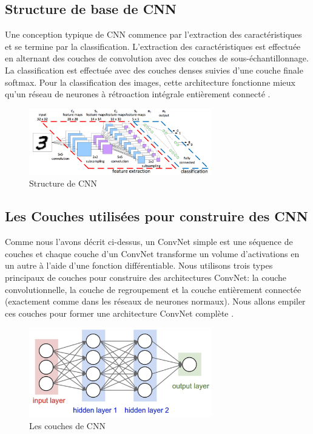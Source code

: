 \documentclass[12pt]{report}
\begin{document}
\subsection{Structure de base de CNN}
Une conception typique de CNN commence par l'extraction des caractéristiques et se termine par la classification. L'extraction des caractéristiques est effectuée en alternant des couches de convolution avec des couches de sous-échantillonnage. La classification est effectuée avec des couches denses suivies d'une couche finale softmax. Pour la classification des images, cette architecture fonctionne mieux qu'un réseau de neurones à rétroaction intégrale entièrement connecté \cite{ref13} .
\begin{figure}[h]
\begin{center}
\includegraphics[width=300]{extract.png}
\caption{Structure de CNN}
\label{Structure de CNN}
\end{center}
\end{figure}


\subsection{Les Couches utilisées pour construire des CNN}
Comme nous l'avons décrit ci-dessus, un ConvNet simple est une séquence de couches et chaque couche d'un ConvNet transforme un volume d'activations en un autre à l'aide d'une fonction différentiable. Nous utilisons trois types principaux de couches pour construire des architectures ConvNet: la couche convolutionnelle, la couche de regroupement et la couche entièrement connectée (exactement comme dans les réseaux de neurones normaux). Nous allons empiler ces couches pour former une architecture ConvNet complète \cite{ref14}.
\begin{figure}[h]
\begin{center}
\includegraphics[width=300]{nnda.png}
\caption{Les couches de CNN}
\label{Les couches de CNN}
\end{center}
\end{figure}
\end{document}
